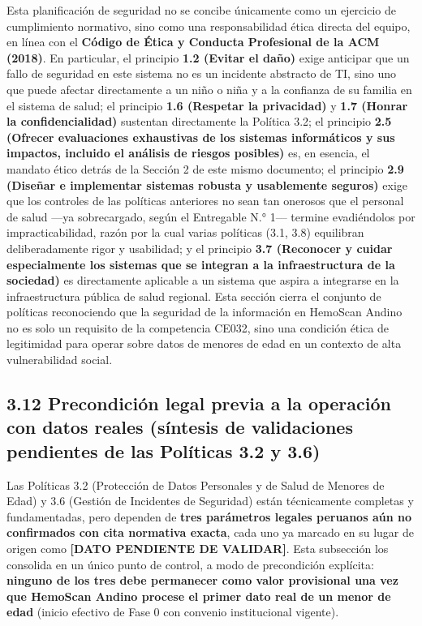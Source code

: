 \documentclass[11pt,a4paper]{article}
\begin{document}
Esta planificación de seguridad no se concibe únicamente como un ejercicio de cumplimiento normativo, sino como una responsabilidad ética directa del equipo, en línea con el \textbf{Código de Ética y Conducta Profesional de la ACM (2018)}. En particular, el principio \textbf{1.2 (Evitar el daño)} exige anticipar que un fallo de seguridad en este sistema no es un incidente abstracto de TI, sino uno que puede afectar directamente a un niño o niña y a la confianza de su familia en el sistema de salud; el principio \textbf{1.6 (Respetar la privacidad)} y \textbf{1.7 (Honrar la confidencialidad)} sustentan directamente la Política 3.2; el principio \textbf{2.5 (Ofrecer evaluaciones exhaustivas de los sistemas informáticos y sus impactos, incluido el análisis de riesgos posibles)} es, en esencia, el mandato ético detrás de la Sección 2 de este mismo documento; el principio \textbf{2.9 (Diseñar e implementar sistemas robusta y usablemente seguros)} exige que los controles de las políticas anteriores no sean tan onerosos que el personal de salud ---ya sobrecargado, según el Entregable N.° 1--- termine evadiéndolos por impracticabilidad, razón por la cual varias políticas (3.1, 3.8) equilibran deliberadamente rigor y usabilidad; y el principio \textbf{3.7 (Reconocer y cuidar especialmente los sistemas que se integran a la infraestructura de la sociedad)} es directamente aplicable a un sistema que aspira a integrarse en la infraestructura pública de salud regional. Esta sección cierra el conjunto de políticas reconociendo que la seguridad de la información en HemoScan Andino no es solo un requisito de la competencia CE032, sino una condición ética de legitimidad para operar sobre datos de menores de edad en un contexto de alta vulnerabilidad social.

\subsection{3.12 Precondición legal previa a la operación con datos reales (síntesis de validaciones pendientes de las Políticas 3.2 y 3.6)}\label{precondiciuxf3n-legal-previa-a-la-operaciuxf3n-con-datos-reales-suxedntesis-de-validaciones-pendientes-de-las-poluxedticas-3.2-y-3.6}

Las Políticas 3.2 (Protección de Datos Personales y de Salud de Menores de Edad) y 3.6 (Gestión de Incidentes de Seguridad) están técnicamente completas y fundamentadas, pero dependen de \textbf{tres parámetros legales peruanos aún no confirmados con cita normativa exacta}, cada uno ya marcado en su lugar de origen como \textbf{{[}DATO PENDIENTE DE VALIDAR{]}}. Esta subsección los consolida en un único punto de control, a modo de precondición explícita: \textbf{ninguno de los tres debe permanecer como valor provisional una vez que HemoScan Andino procese el primer dato real de un menor de edad} (inicio efectivo de Fase 0 con convenio institucional vigente).
\end{document}
